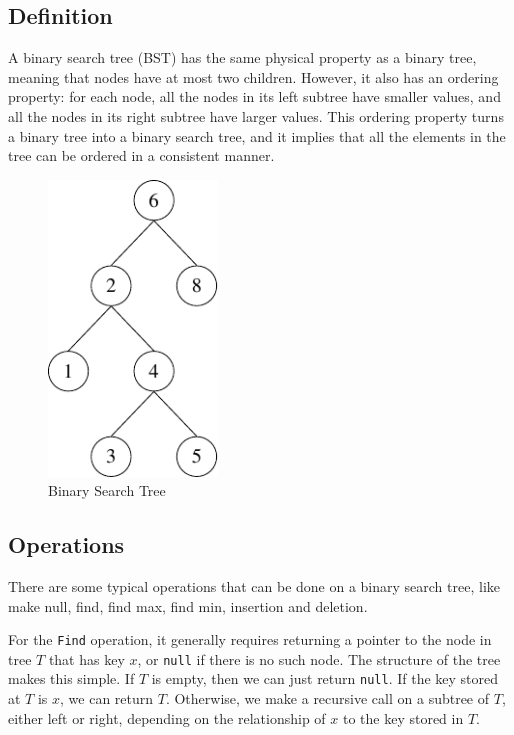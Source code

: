 \subsection{Definition}
\begin{minipage}{0.6\textwidth}
  A binary search tree (BST) has the same physical property as a binary tree, meaning that nodes have at most two children. However, it also has an ordering property: for each node, all the nodes in its left subtree have smaller values, and all the nodes in its right subtree have larger values. This ordering property turns a binary tree into a binary search tree, and it implies that all the elements in the tree can be ordered in a consistent manner.
\end{minipage}\quad
\begin{minipage}{0.3\textwidth}
  \begin{figure}[H]
    \centering
    \includegraphics[width=0.4\textwidth]{Figure/BST.pdf}
    \caption{Binary Search Tree}
  \end{figure}
\end{minipage}

\subsection{Operations}
There are some typical operations that can be done on a binary search tree, like make null, find, find max, find min, insertion and deletion. 

For the \verb|Find| operation, it generally requires returning a pointer to the node in tree \(T\) that has key \(x\), or \verb|null| if there is no such node. The structure of the tree makes this simple. If \(T\) is empty, then we can just return \verb|null|. If the key stored at \(T\) is \(x\), we can return \(T\). Otherwise, we make a recursive call on a subtree of \(T\), either left or right, depending on the relationship of \(x\) to the key stored in \(T\).

